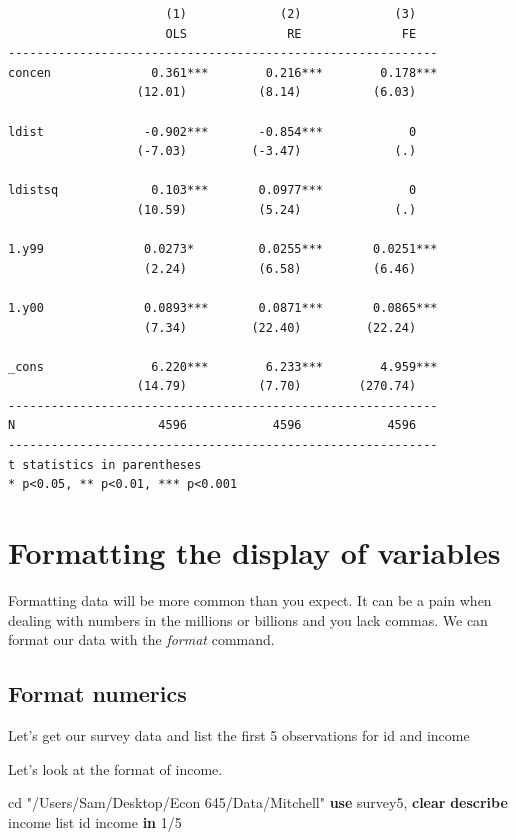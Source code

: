 \documentclass[
]{book}
\newenvironment{Shaded}{\begin{snugshade}}{\end{snugshade}}
\newcommand{\KeywordTok}[1]{\textcolor[rgb]{0.13,0.29,0.53}{\textbf{#1}}}
\newcommand{\NormalTok}[1]{#1}
\newcommand{\OtherTok}[1]{\textcolor[rgb]{0.56,0.35,0.01}{#1}}
\newcommand{\StringTok}[1]{\textcolor[rgb]{0.31,0.60,0.02}{#1}}
\begin{document}
\begin{verbatim}
                      (1)             (2)             (3)   
                      OLS              RE              FE   
------------------------------------------------------------
concen              0.361***        0.216***        0.178***
                  (12.01)          (8.14)          (6.03)   

ldist              -0.902***       -0.854***            0   
                  (-7.03)         (-3.47)             (.)   

ldistsq             0.103***       0.0977***            0   
                  (10.59)          (5.24)             (.)   

1.y99              0.0273*         0.0255***       0.0251***
                   (2.24)          (6.58)          (6.46)   

1.y00              0.0893***       0.0871***       0.0865***
                   (7.34)         (22.40)         (22.24)   

_cons               6.220***        6.233***        4.959***
                  (14.79)          (7.70)        (270.74)   
------------------------------------------------------------
N                    4596            4596            4596   
------------------------------------------------------------
t statistics in parentheses
* p<0.05, ** p<0.01, *** p<0.001
\end{verbatim}

\chapter{Formatting the display of variables}\label{formatting-the-display-of-variables}

Formatting data will be more common than you expect. It can be a pain when dealing with numbers in the millions or billions and you lack commas. We can format our data with the \emph{format} command.

\section{Format numerics}\label{format-numerics}

Let's get our survey data and list the first 5 observations for id and income

Let's look at the format of income.

\begin{Shaded}
\begin{Highlighting}[]
\NormalTok{cd }\StringTok{"/Users/Sam/Desktop/Econ 645/Data/Mitchell"}
\KeywordTok{use}\NormalTok{ survey5, }\KeywordTok{clear}
\KeywordTok{describe}\NormalTok{ income}
\OtherTok{list}\NormalTok{ id income }\KeywordTok{in}\NormalTok{ 1/5}
\end{Highlighting}
\end{Shaded}
\end{document}
